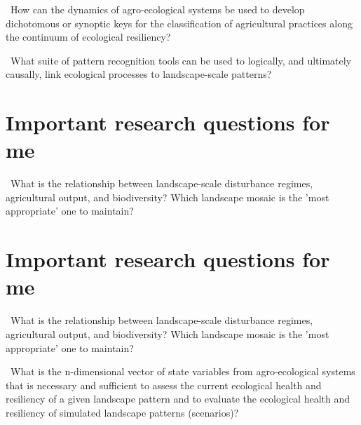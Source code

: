\documentclass[
paper=128mm:96mm, %
fontsize=11pt, %
pagesize, %
parskip=half-, %
]{scrartcl} %
\theoremstyle{mythmstyle} %
\begin{document}
\textasteriskcentered \ How can the dynamics of agro-ecological systems be used to develop dichotomous or synoptic keys for the classification of agricultural practices along the continuum of ecological resiliency?

\textasteriskcentered \ What suite of pattern recognition tools can be used to logically, and ultimately causally, link ecological processes to landscape-scale patterns?
\clearpage
\section{Important research questions for me}
\scriptsize 
\textasteriskcentered \ What is the relationship between landscape-scale disturbance regimes, agricultural output, and biodiversity? Which landscape mosaic is the 'most appropriate' one to maintain?



\clearpage
\section{Important research questions for me}
\textasteriskcentered \ What is the relationship between landscape-scale disturbance regimes, agricultural output, and biodiversity? Which landscape mosaic is the 'most appropriate' one to maintain?

\textasteriskcentered \ What is the n-dimensional vector of state variables from agro-ecological systems that is necessary and sufficient to assess the current ecological health and resiliency of a given landscape pattern and to evaluate the ecological health and resiliency of simulated landscape patterns (scenarios)?
\end{document}
